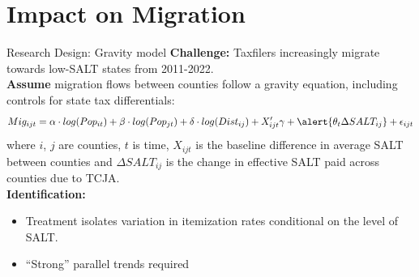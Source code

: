 \documentclass[10pt, aspectratio=169]{beamer}
\begin{document}
\section{Impact on Migration}

\begin{frame}{Research Design: Gravity model}
    \textbf{Challenge:} Taxfilers increasingly migrate towards low-SALT states from 2011-2022.\\
    \vspace{.5cm}
    \textbf{Assume} migration flows between counties follow a gravity equation, including controls for state tax differentials:
    $$Mig_{ijt} = \alpha \cdot log(Pop_{it}) + \beta \cdot log(Pop_{jt}) + \delta \cdot log(Dist_{ij}) + X_{ijt}^\prime \gamma + \alert{\theta_t\Delta SALT_{ij}} + \epsilon_{ijt}$$
    where $i$, $j$ are counties, $t$ is time, $X_{ijt}$ is the baseline difference in average SALT between counties and $\Delta SALT_{ij}$ is the change in effective SALT paid across counties due to TCJA.\\
    \vspace{.5cm}
    \textbf{Identification:}
    \begin{itemize}
        \item Treatment isolates variation in itemization rates conditional on the level of SALT.
        \item ``Strong'' parallel trends required \citep{CallawayGoodman-BaconSantanna2024}
    \end{itemize}

\end{frame}
\end{document}
